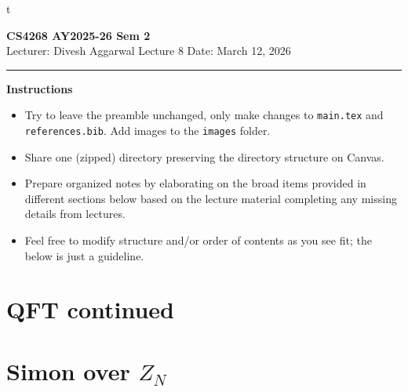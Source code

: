 t%




% 


\newpage
\noindent
\textbf{CS4268 AY2025-26 Sem 2}
\\
\noindent
Lecturer: Divesh Aggarwal
\hfill
Lecture 8                      %
\hfill
Date: March 12, 2026          %


\noindent
\rule{\textwidth}{1pt}

\medskip


\textbf{Instructions}\\
\begin{itemize}
    \item Try to leave the preamble unchanged, only make changes to \texttt{main.tex} and  \texttt{references.bib}. Add images to the \texttt{images} folder. 
    \item Share one (zipped) directory preserving the directory structure on Canvas. 
    \item Prepare organized notes by elaborating on the broad items provided in different sections below based on the lecture material completing any missing details from lectures.
    \item Feel free to modify structure and/or order of contents as you see fit; the below is just a guideline.
\end{itemize} 



\section{QFT continued}



\section{Simon over $Z_N$}
















% 
% 
% 
